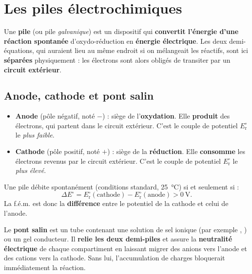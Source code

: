 \documentclass[11pt,a4paper]{article}
\newcommand{\fem}{\ensuremath{\Delta E}}        %
\begin{document}
\section{Les piles électrochimiques}

Une \textbf{pile} (ou pile \emph{galvanique}) est un dispositif qui \textbf{convertit l'énergie
d'une réaction spontanée} d'oxydo-réduction en \textbf{énergie électrique}. Les deux demi-équations,
qui auraient lieu au même endroit si on mélangeait les réactifs, sont ici \textbf{séparées}
physiquement : les électrons sont alors obligés de transiter par un \textbf{circuit extérieur}.

\subsection{Anode, cathode et pont salin}

\begin{definition}
\begin{itemize}[leftmargin=1.6em,topsep=1pt,itemsep=2pt]
  \item \textbf{Anode} (pôle négatif, noté $-$) : siège de l'\textbf{oxydation}. Elle
        \textbf{produit} des électrons, qui partent dans le circuit extérieur. C'est le couple de
        potentiel $E_{\mathrm{r}}^{\circ}$ le \emph{plus faible}.
  \item \textbf{Cathode} (pôle positif, noté $+$) : siège de la \textbf{réduction}. Elle
        \textbf{consomme} les électrons revenus par le circuit extérieur. C'est le couple de
        potentiel $E_{\mathrm{r}}^{\circ}$ le \emph{plus élevé}.
\end{itemize}
\end{definition}

\begin{theoreme}
Une pile débite spontanément (conditions standard, \SI{25}{\celsius}) si et seulement si :
\[
\fem^{\circ}=E_{\mathrm{r}}^{\circ}(\text{cathode})-E_{\mathrm{r}}^{\circ}(\text{anode})>0\ \mathrm{V}.
\]
La f.é.m. est donc la \textbf{différence} entre le potentiel de la cathode et celui de l'anode.
\end{theoreme}

\begin{definition}
Le \textbf{pont salin} est un tube contenant une solution de sel ionique (par exemple ,
) ou un gel conducteur. Il \textbf{relie les deux demi-piles} et assure la
\textbf{neutralité électrique} de chaque compartiment en laissant migrer des anions vers l'anode
et des cations vers la cathode. Sans lui, l'accumulation de charges bloquerait immédiatement la
réaction.
\end{definition}
\end{document}
